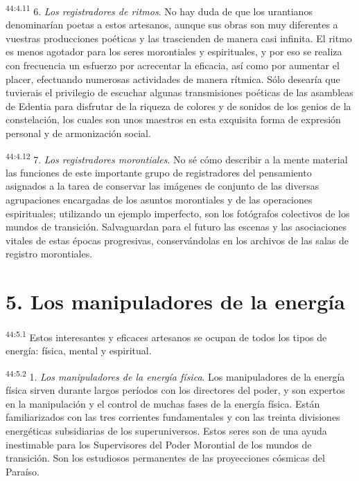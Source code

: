 \par
\textsuperscript{44:4.11} 6. \textit{Los registradores de ritmos}. No hay duda de que los urantianos denominarían poetas a estos artesanos, aunque sus obras son muy diferentes a vuestras producciones poéticas y las trascienden de manera casi infinita. El ritmo es menos agotador para los seres morontiales y espirituales, y por eso se realiza con frecuencia un esfuerzo por acrecentar la eficacia, así como por aumentar el placer, efectuando numerosas actividades de manera rítmica. Sólo desearía que tuvierais el privilegio de escuchar algunas transmisiones poéticas de las asambleas de Edentia para disfrutar de la riqueza de colores y de sonidos de los genios de la constelación, los cuales son unos maestros en esta exquisita forma de expresión personal y de armonización social.

\par
\textsuperscript{44:4.12} 7. \textit{Los registradores morontiales}. No sé cómo describir a la mente material las funciones de este importante grupo de registradores del pensamiento asignados a la tarea de conservar las imágenes de conjunto de las diversas agrupaciones encargadas de los asuntos morontiales y de las operaciones espirituales; utilizando un ejemplo imperfecto, son los fotógrafos colectivos de los mundos de transición. Salvaguardan para el futuro las escenas y las asociaciones vitales de estas épocas progresivas, conservándolas en los archivos de las salas de registro morontiales.

\section*{5. Los manipuladores de la energía}
\par
\textsuperscript{44:5.1} Estos interesantes y eficaces artesanos se ocupan de todos los tipos de energía: física, mental y espiritual.

\par
\textsuperscript{44:5.2} 1. \textit{Los manipuladores de la energía física}. Los manipuladores de la energía física sirven durante largos períodos con los directores del poder, y son expertos en la manipulación y el control de muchas fases de la energía física. Están familiarizados con las tres corrientes fundamentales y con las treinta divisiones energéticas subsidiarias de los superuniversos. Estos seres son de una ayuda inestimable para los Supervisores del Poder Morontial de los mundos de transición. Son los estudiosos permanentes de las proyecciones cósmicas del Paraíso.

